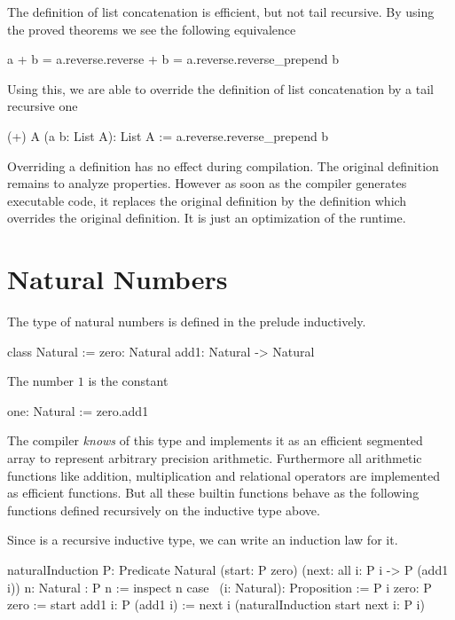 The definition of list concatenation is efficient, but not tail recursive. By
using the proved theorems we see the following equivalence
%
\begin{alba}
  a + b   =  a.reverse.reverse + b
          =  a.reverse.reverse_prepend b
\end{alba}

Using this, we are able to override the definition of list concatenation by a
tail recursive one

\begin{alba}
  (+) A (a b: List A): List A :=
    a.reverse.reverse_prepend b
\end{alba}

Overriding a definition has no effect during compilation. The original
definition remains to analyze properties. However as soon as the compiler
generates executable code, it replaces the original definition by the
definition which overrides the original definition. It is just an optimization
of the runtime.





\section{Natural Numbers}


The type of natural numbers is defined in the prelude inductively.

\begin{alba}
  class Natural :=
    zero: Natural
    add1: Natural -> Natural
\end{alba}

The number $1$ is the constant

\begin{alba}
  one: Natural := zero.add1
\end{alba}

The compiler \emph{knows} of this type and implements it as an efficient
segmented array to represent arbitrary precision arithmetic. Furthermore all
arithmetic functions like addition, multiplication and relational operators
are implemented as efficient functions. But all these builtin functions behave
as the following functions defined recursively on the inductive type above.

Since  is a recursive inductive type, we can write an induction
law for it.

\begin{alba}
    naturalInduction
        {P: Predicate Natural}
        (start: P zero)
        (next: all {i}: P i -> P (add1 i))
        {n: Natural}
        : P n
    :=
        inspect n case
            {\ (i: Natural): Proposition := P i}
            zero: P zero :=
                start
            add1 i: P (add1 i) :=
                next
                    {i}
                    (naturalInduction start next {i}: P i)
\end{alba}

